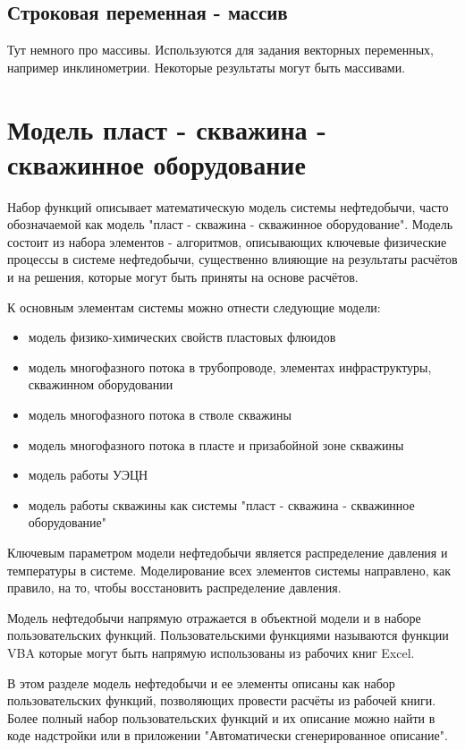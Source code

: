 \subsection{Строковая переменная - массив}
Тут немного про массивы. Используются для задания векторных переменных, например инклинометрии. Некоторые результаты могут быть массивами.


\section{Модель пласт - скважина - скважинное оборудование}

Набор функций \unf{} описывает математическую модель системы нефтедобычи, часто обозначаемой как модель "пласт - скважина - скважинное оборудование". Модель состоит из набора элементов - алгоритмов, описывающих ключевые физические процессы в системе нефтедобычи, существенно влияющие на результаты расчётов и на решения, которые могут быть приняты на основе расчётов.

К основным элементам системы можно отнести следующие модели:
\begin{itemize}
	\item модель физико-химических свойств пластовых флюидов
	\item модель многофазного потока в трубопроводе, элементах инфраструктуры, скважинном оборудовании
	\item модель многофазного потока в стволе скважины
	\item модель многофазного потока в пласте и призабойной зоне скважины
	\item модель работы УЭЦН
	\item модель работы скважины как системы "пласт - скважина - скважинное оборудование"
\end{itemize}

Ключевым параметром модели нефтедобычи является распределение давления и температуры в системе. Моделирование всех элементов системы направлено, как правило, на то, чтобы восстановить распределение давления.

Модель нефтедобычи напрямую отражается в объектной модели \unf{} и в наборе пользовательских функций. Пользовательскими функциями называются функции VBA которые могут быть напрямую использованы из рабочих книг Excel. 

В этом разделе модель нефтедобычи и ее элементы описаны как набор пользовательских функций, позволяющих провести расчёты из рабочей книги. Более полный набор пользовательских функций и их описание можно найти в коде надстройки или в приложении "Автоматически сгенерированное описание".

